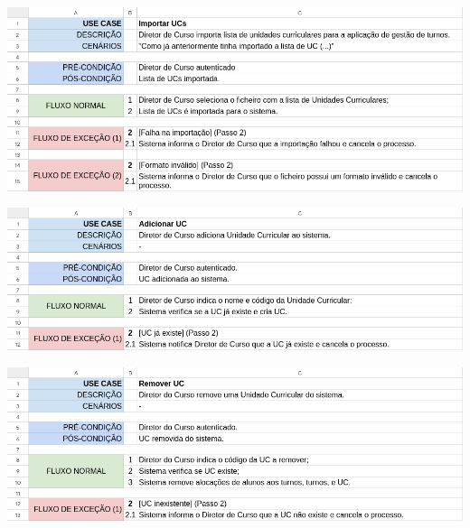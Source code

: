 \documentclass[a4paper,12pt]{scrreprt}
\begin{document}
\begin{minipage}{\textwidth}
    \centering
    \includegraphics[width=1\textwidth]{images/use-cases/descriptions/11-Importar UCs.png}
    \label{fig:3-11-importar_ucs}
\end{minipage}

\begin{minipage}{\textwidth}
    \centering
    \includegraphics[width=1\textwidth]{images/use-cases/descriptions/12-Adicionar UC.png}
    \label{fig:3-12-adicionar_uc}
\end{minipage}

\begin{minipage}{\textwidth}
    \centering
    \includegraphics[width=1\textwidth]{images/use-cases/descriptions/13-Remover UC.png}
    \label{fig:3-13-remover_uc}
\end{minipage}
\end{document}
